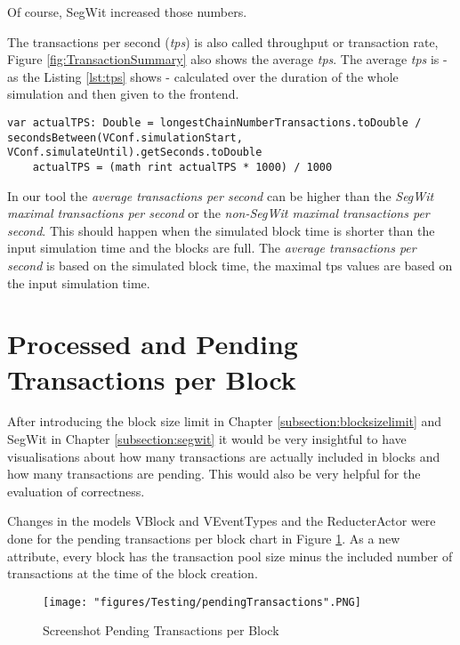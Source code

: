 Of course, SegWit increased those numbers.

The transactions per second (\textit{tps}) is also called throughput or transaction rate, Figure \ref{fig:TransactionSummary} also shows the average \textit{tps}. The average \textit{tps} is - as the Listing \ref{lst:tps} shows - calculated over the duration of the whole simulation and then given to the frontend.

\begin{minipage}{\linewidth}
\begin{lstlisting}[style=myScalastyle,label=lst:tps,
caption={Calculations for the tps in the ReducerActor}]
    var actualTPS: Double = longestChainNumberTransactions.toDouble / secondsBetween(VConf.simulationStart, VConf.simulateUntil).getSeconds.toDouble
    actualTPS = (math rint actualTPS * 1000) / 1000
\end{lstlisting}
\end{minipage}

In our tool the \textit{average transactions per second} can be higher than the \textit{SegWit maximal transactions per second} or the \textit{non-SegWit maximal transactions per second}. This should happen when the simulated block time is shorter than the input simulation time and the blocks are full. The \textit{average transactions per second} is based on the simulated block time, the maximal tps values are based on the input simulation time.

\section{Processed and Pending Transactions per Block}

After introducing the block size limit in Chapter \ref{subsection:blocksizelimit} and SegWit in Chapter \ref{subsection:segwit} it would be very insightful to have visualisations about how many transactions are actually included in blocks and how many transactions are pending. This would also be very helpful for the evaluation of correctness.

Changes in the models VBlock and VEventTypes and the ReducterActor were done for the pending transactions per block chart in Figure \ref{fig:pendingTransactions}. As a new attribute, every block has the transaction pool size minus the included number of transactions at the time of the block creation.

\begin{figure}[!htb]
\centering
\texttt{[image: "figures/Testing/pendingTransactions".PNG]}
\caption{Screenshot Pending Transactions per Block
\label{fig:pendingTransactions}}
\end{figure}

